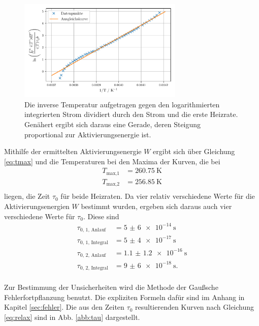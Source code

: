 \begin{figure}
    \centering
    \includegraphics[width=0.7\textwidth]{figures/integral2.pdf}
    \caption{Die inverse Temperatur aufgetragen gegen den logarithmierten integrierten Strom dividiert durch den Strom und die erste Heizrate. Genähert ergibt sich daraus eine Gerade, deren Steigung proportional zur Aktivierungsenergie ist.}
    \label{abb:integral2}
\end{figure}

Mithilfe der ermittelten Aktivierungsenergie $W$ ergibt sich über Gleichung \eqref{eq:tmax} und die Temperaturen bei den Maxima der Kurven, die bei 
\begin{align*}
    T_\text{max,1} &= \SI{260.75}{\kelvin} \\
    T_\text{max,2} &= \SI{256.85}{\kelvin} \\
\end{align*}
liegen, die Zeit $\tau_0$ für beide Heizraten. Da vier relativ verschiedene Werte für die Aktivierungsenergien $W$ bestimmt wurden, ergeben sich daraus auch vier verschiedene Werte für $\tau_0$.
Diese sind 
\begin{align*}
    \tau_\text{0, 1, Anlauf} &= \SI{5(6)e-14}{\second} \\
    \tau_\text{0, 1, Integral} &= \SI{5(4)e-17}{\second} \\
    \tau_\text{0, 2, Anlauf} &= \SI{1.1(12)e-16}{\second} \\
    \tau_\text{0, 2, Integral} &= \SI{9(6)e-18}{\second}. \\
\end{align*}

Zur Bestimmung der Unsicherheiten wird die Methode der Gaußsche Fehlerfortpflanzung benutzt. Die expliziten Formeln dafür sind im Anhang in Kapitel \ref{sec:fehler}.
Die aus den Zeiten $\tau_0$ resultierenden Kurven nach Gleichung \eqref{eq:relax} sind in Abb. \ref{abb:tau} dargestellt.

